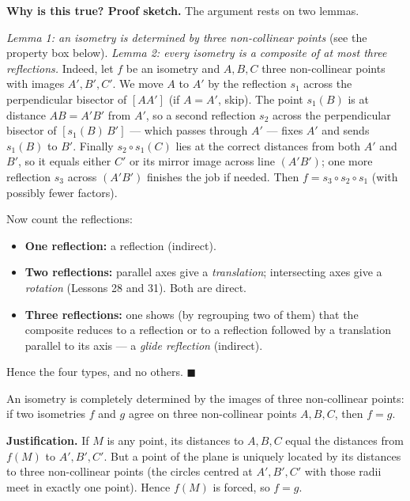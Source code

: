 \documentclass[11pt]{article}
\begin{document}
\textbf{Why is this true? Proof sketch.} The argument rests on two lemmas.

\emph{Lemma 1: an isometry is determined by three non-collinear points} (see the property box below). \emph{Lemma 2: every isometry is a composite of at most three reflections.} Indeed, let $f$ be an isometry and $A,B,C$ three non-collinear points with images $A',B',C'$. We move $A$ to $A'$ by the reflection $s_1$ across the perpendicular bisector of $[AA']$ (if $A=A'$, skip). The point $s_1(B)$ is at distance $AB = A'B'$ from $A'$, so a second reflection $s_2$ across the perpendicular bisector of $[s_1(B)\,B']$ — which passes through $A'$ — fixes $A'$ and sends $s_1(B)$ to $B'$. Finally $s_2\circ s_1(C)$ lies at the correct distances from both $A'$ and $B'$, so it equals either $C'$ or its mirror image across line $(A'B')$; one more reflection $s_3$ across $(A'B')$ finishes the job if needed. Then $f = s_3\circ s_2\circ s_1$ (with possibly fewer factors).

Now count the reflections:
\begin{itemize}
\item \textbf{One reflection:} a reflection (indirect).
\item \textbf{Two reflections:} parallel axes give a \emph{translation}; intersecting axes give a \emph{rotation} (Lessons 28 and 31). Both are direct.
\item \textbf{Three reflections:} one shows (by regrouping two of them) that the composite reduces to a reflection or to a reflection followed by a translation parallel to its axis — a \emph{glide reflection} (indirect).
\end{itemize}
Hence the four types, and no others. $\blacksquare$

\begin{propriete}
An isometry is completely determined by the images of three non-collinear points: if two isometries $f$ and $g$ agree on three non-collinear points $A,B,C$, then $f=g$.
\end{propriete}

\textbf{Justification.} If $M$ is any point, its distances to $A,B,C$ equal the distances from $f(M)$ to $A',B',C'$. But a point of the plane is uniquely located by its distances to three non-collinear points (the circles centred at $A',B',C'$ with those radii meet in exactly one point). Hence $f(M)$ is forced, so $f=g$.
\end{document}
